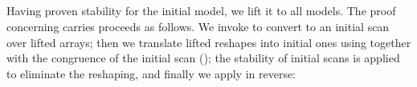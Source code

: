 \begin{code}[hide]
\<%
\\
\>[2][@{}l@{\AgdaIndent{0}}]%
\>[4]\AgdaSpace{}%
\AgdaSymbol{(}\AgdaSymbol{;}\AgdaSpace{}%
\AgdaSymbol{;}\AgdaSpace{}%
\AgdaSymbol{)}\<%
\\
%
\>[4]\AgdaSpace{}%
\AgdaSymbol{(}\AgdaSpace{}%
\AgdaSpace{}%
\AgdaSymbol{;}\AgdaSpace{}%
\AgdaSpace{}%
\AgdaSpace{}%
\AgdaSymbol{)}\<%
\\
\>[0]\<%
\\
%
\>[2]\AgdaSpace{}%
\AgdaSpace{}%
\<%
\\
%
\\[\AgdaEmptyExtraSkip]%
%
\\[\AgdaEmptyExtraSkip]%
%
\\[\AgdaEmptyExtraSkip]%
%
\>[2]\AgdaSpace{}%
\<%
\\
\>[2][@{}l@{\AgdaIndent{0}}]%
\>[4]\AgdaSpace{}%
\AgdaSpace{}%
\AgdaSymbol{:}\AgdaSpace{}%
\<%
\end{code}
Having proven stability for the initial model, we lift it to all models.
The proof concerning carries proceeds as follows.  We invoke
 to convert to an initial scan over lifted arrays; then we
translate lifted reshapes into initial ones using  together
with the congruence of the initial scan (); the stability of initial scans is applied to eliminate the reshaping, and finally
we apply  in reverse:
